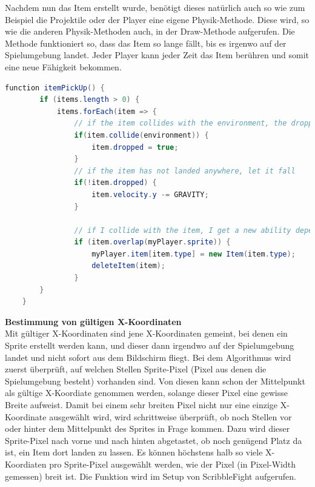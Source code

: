 Nachdem nun das Item erstellt wurde, benötigt dieses natürlich auch so wie zum Beispiel die Projektile oder der Player eine eigene Physik-Methode. Diese wird, so wie die anderen Physik-Methoden auch, in der Draw-Methode aufgerufen.
Die Methode funktioniert so, dass das Item so lange fällt, bis es irgenwo auf der Spielumgebung landet. Jeder Player kann jeder Zeit das Item berühren und somit eine neue Fähigkeit bekommen.

\begin{lstlisting}[caption=Item-Physik,language=Java,label=lst:impl:itemPhy]
    function itemPickUp() {
        if (items.length > 0) {
            items.forEach(item => {
                // if the item collides with the environment, the dropped-attribute becomes true
                if(item.collide(environment)) {
                    item.dropped = true;
                }
                // if the item has not landed anywhere, let it fall 
                if(!item.dropped) {
                    item.velocity.y -= GRAVITY;
                }
    
                // if I collide with the item, I get a new ability depending on the type of the item and the item gets deleted
                if (item.overlap(myPlayer.sprite)) {
                    myPlayer.item[item.type] = new Item(item.type);
                    deleteItem(item);
                }
        }
    }
    \end{lstlisting}

\textbf{Bestimmung von gültigen X-Koordinaten} \label{impl:xCoordinates}
\\
Mit gültiger X-Koordinaten sind jene X-Koordinaten gemeint, bei denen ein Sprite erstellt werden kann, und dieser dann irgendwo auf der Spielumgebung landet und nicht sofort aus dem Bildschirm fliegt.
Bei dem Algorithmus wird zuerst überprüft, auf welchen Stellen Sprite-Pixel (Pixel aus denen die Spielumgebung besteht) vorhanden sind. Von diesen kann schon der Mittelpunkt als gültige X-Koordiate genommen werden, solange dieser Pixel eine gewisse Breite aufweist.
Damit bei einem sehr breiten Pixel nicht nur eine einzige X-Koordinate ausgewählt wird, wird schrittweise überprüft, ob noch Stellen vor oder hinter dem Mittelpunkt des Sprites in Frage kommen.
Dazu wird dieser Sprite-Pixel nach vorne und nach hinten abgetastet, ob noch genügend Platz da ist, ein Item dort landen zu lassen.
Es können höchstens halb so viele X-Koordiaten pro Sprite-Pixel ausgewählt werden, wie der Pixel (in Pixel-Width gemessen) breit ist.
Die Funktion wird im Setup von ScribbleFight aufgerufen.

